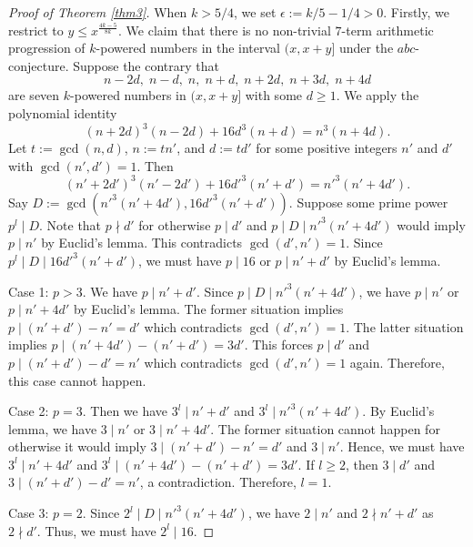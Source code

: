\documentclass[12pt]{article}
\begin{document}
\begin{proof}[Proof of Theorem \ref{thm3}]
When $k > 5/4$, we set $\epsilon := k / 5 - 1 / 4 > 0$. Firstly, we restrict to $y \le x^{\frac{4k - 5}{8k}}$. We claim that there is no non-trivial $7$-term arithmetic progression of $k$-powered numbers in the interval $(x, x + y]$ under the $abc$-conjecture. Suppose the contrary that
\[
n - 2d, \; n - d, \; n, \; n + d, \; n + 2d, \; n + 3d, \; n + 4d
\]
are seven $k$-powered numbers in $(x, x + y]$ with some $d \ge 1$. We apply the polynomial identity
\[
(n + 2d)^3 (n - 2d) + 16 d^3 (n + d) = n^3 (n + 4d). 
\]
Let $t := \gcd(n, d)$, $n := t n'$, and $d := t d'$ for some positive integers $n'$ and $d'$ with $\gcd(n', d') = 1$. Then
\[
(n' + 2d')^3 (n' - 2d') + 16 d'^3 (n' + d') = n'^3 (n' + 4d').
\]
Say $D := \gcd( n'^3 (n' + 4 d'), 16 d'^3 (n' + d'))$. Suppose some prime power $p^l \mid D$. Note that $p \nmid d'$ for otherwise $p \mid d'$ and $p \mid D \mid n'^3 (n' + 4 d')$ would imply $p \mid n'$ by Euclid's lemma. This contradicts $\gcd(d', n') = 1$. Since $p^l \mid D \mid 16 d'^3 (n' + d')$, we must have $p \mid 16$ or $p \mid n' + d'$ by Euclid's lemma.

\bigskip

Case 1: $p > 3$. We have $p \mid n' + d'$. Since $p \mid D \mid n'^3 (n' + 4 d')$, we have $p \mid n'$ or $p \mid n' + 4 d'$ by Euclid's lemma. The former situation implies $p \mid (n' + d') - n' = d'$ which contradicts $\gcd(d', n') = 1$. The latter situation implies $p \mid (n' + 4 d') - (n' + d') = 3 d'$. This forces $p \mid d'$ and $p \mid (n' + d') - d' = n'$ which contradicts $\gcd(d', n') = 1$ again. Therefore, this case cannot happen.

\bigskip

Case 2: $p = 3$. Then we have $3^l \mid n' + d'$ and $3^l \mid n'^3 (n' + 4d')$. By Euclid's lemma, we have $3 \mid n'$ or $3 \mid n' + 4 d'$. The former situation cannot happen for otherwise it would imply $3 \mid (n' + d') - n' = d'$ and $3 \mid n'$. Hence, we must have $3^l \mid n' + 4 d'$ and $3^l \mid (n' + 4 d') - (n' + d') = 3 d'$. If $l \ge 2$, then $3 \mid d'$ and $3 \mid (n' + d') - d' = n'$, a contradiction. Therefore, $l = 1$.

\bigskip

Case 3: $p = 2$. Since $2^l \mid D \mid n'^3 (n' + 4 d')$, we have $2 \mid n'$ and $2 \nmid n' + d'$ as $2 \nmid d'$. Thus, we must have $2^l \mid 16$.

\bigskip


\end{proof}
\end{document}
